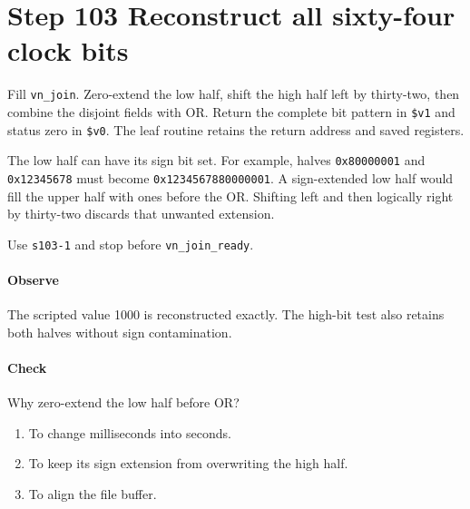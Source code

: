 \section{Step 103 Reconstruct all sixty-four clock bits}
Fill \texttt{vn\_join}. Zero-extend the low half, shift the high half left by thirty-two, then combine the disjoint fields with OR. Return the complete bit pattern in \texttt{\$v1} and status zero in \texttt{\$v0}. The leaf routine retains the return address and saved registers.

The low half can have its sign bit set. For example, halves \texttt{0x80000001} and \texttt{0x12345678} must become \texttt{0x1234567880000001}. A sign-extended low half would fill the upper half with ones before the OR. Shifting left and then logically right by thirty-two discards that unwanted extension.

Use \texttt{s103-1} and stop before \texttt{vn\_join\_ready}.

\paragraph{Observe} The scripted value 1000 is reconstructed exactly. The high-bit test also retains both halves without sign contamination.

\paragraph{Check} Why zero-extend the low half before OR?
\begin{enumerate}[label=\Alph*.]
  \item To change milliseconds into seconds.
  \item To keep its sign extension from overwriting the high half.
  \item To align the file buffer.
\end{enumerate}
